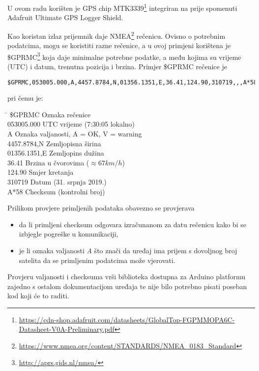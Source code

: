 U ovom radu korišten je GPS chip MTK3339\footnote{\url{https://cdn-shop.adafruit.com/datasheets/GlobalTop-FGPMMOPA6C-Datasheet-V0A-Preliminary.pdf}} integriran na prije spomenuti Adafruit Ultimate GPS Logger Shield.

Kao koristan izlaz prijemnik daje NMEA\footnote{\url{https://www.nmea.org/content/STANDARDS/NMEA_0183_Standard}} rečenicu. 
Ovisno o potrebnim podatcima, mogu se koristiti razne rečenice, a u ovoj primjeni korištena je \$GPRMC\footnote{\url{http://aprs.gids.nl/nmea/}} koja daje minimalne potrebne podatke, a među kojima su vrijeme (UTC) i datum, trenutna pozicija i brzina.
Primjer \$GPRMC rečenice je \begin{verbatim}
$GPRMC,053005.000,A,4457.8784,N,01356.1351,E,36.41,124.90,310719,,,A*58
\end{verbatim}
pri čemu je:
\begin{tabbing}
\hspace{80pt}\=\kill
 \$GPRMC \> Oznaka rečenice \\ 
 053005.000 \> UTC vrijeme (7:30:05 lokalno)\\ 
 A \> Oznaka valjanosti, A = OK, V = warning \\ 
 4457.8784,N \> Zemljopisna širina \\ 
 01356.1351,E \> Zemljopins dužina \\ 
 36.41 \> Brzina u čvorovima ($\approx 67 km/h$)\\ 
 124.90 \> Smjer kretanja \\
 310719 \> Datum (31. srpnja 2019.)\\
 A*58 \> Checksum (kontrolni broj)
\end{tabbing} 
Prilikom provjere primljenih podataka obavezno se provjerava
\begin{itemize}
\item da li primljeni checksum odgovara izračunanom za datu rečenicu kako bi se izbjegle pogreške u komunikaciji,
\item je li oznaka valjanosti \textit{A} što znači da uređaj ima prijem s dovoljnog broj satelita da se primljenim podatcima može vjerovati.
\end{itemize}
Provjeru valjanosti i checksuma vrši biblioteka dostupna za Arduino platformu zajedno s ostalom dokumentacijom uređaja te nije bilo potrebno pisati poseban kod koji će to raditi.

